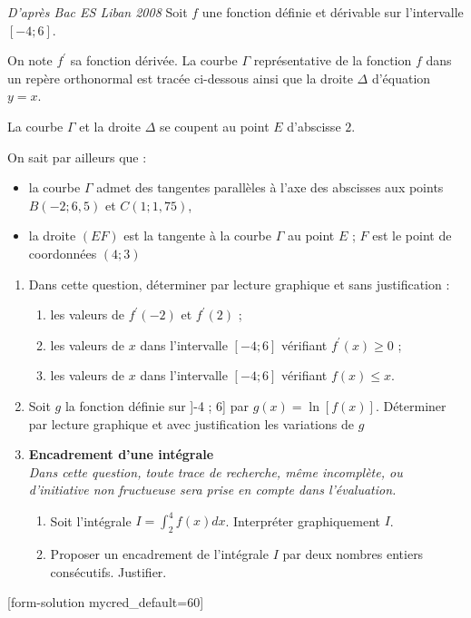 
%
\textit{D'après Bac ES Liban 2008}
Soit $f$ une fonction définie et dérivable sur l'intervalle $\left[-4 ; 6\right]$.
\par
On note $f^{\prime}$ sa fonction dérivée. La courbe $\Gamma $ représentative de la fonction $f$ dans un repère orthonormal est tracée ci-dessous ainsi que la droite $\Delta $ d'équation $y=x$.
\par
La courbe $\Gamma $ et la droite $\Delta $ se coupent au point $E$ d'abscisse $2$.
\par
On sait par ailleurs que :
\begin{itemize}
     \item
     la courbe $\Gamma $ admet des tangentes parallèles à l'axe des abscisses aux points $B \left(-2 ; 6,5\right)$ et $C\left(1 ; 1,75\right)$,
     \item
     la droite $\left(EF\right)$ est la tangente à la courbe $\Gamma $ au point $E$ ; $F$ est le point de coordonnées $\left(4 ; 3\right)$
\end{itemize}

\begin{center}
\end{center}

\begin{enumerate}
     \item
     Dans cette question, déterminer par lecture graphique et sans justification :
     \begin{enumerate}[label=\alph*.]
          \item
          les valeurs de $f^{\prime}\left(-2\right)$ et $f^{\prime}\left(2\right)$ ;
          \item
          les valeurs de $x$ dans l'intervalle $\left[-4 ; 6\right]$ vérifiant $f^{\prime}\left(x\right)\geqslant 0$ ;
          \item
          les valeurs de $x$ dans l'intervalle $\left[-4 ; 6\right]$ vérifiant $f\left(x\right) \leqslant x$.
     \end{enumerate}
     \item
     Soit $g$ la fonction définie sur ]-4 ; 6] par $g\left(x\right)=\ln\left[f\left(x\right)\right]$. Déterminer par lecture graphique et avec justification les variations de $g$
     \item
     \textbf{Encadrement d'une intégrale}
\\
     \textit{Dans cette question, toute trace de recherche, même incomplète, ou d'initiative non fructueuse sera prise en compte dans l'évaluation.}
     \begin{enumerate}[label=\alph*.]
          \item
          Soit l'intégrale $I=\int_{ 2}^{ 4} f\left(x\right) dx$. Interpréter graphiquement $I$.
          \item
          Proposer un encadrement de l'intégrale $I$ par deux nombres entiers consécutifs. Justifier.
     \end{enumerate}
\end{enumerate}
[form-solution mycred_default=60]
